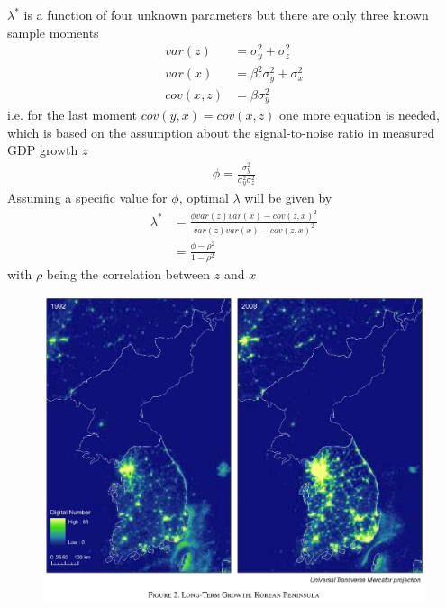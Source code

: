 \documentclass{beamer}
\begin{document}
\begin{frame}
  $\lambda^*$ is a function of four unknown parameters but there are only three known sample moments
  \begin{align}
    var(z) &= \sigma^2_y + \sigma^2_z\\
    var(x) &= \beta^2 \sigma^2_y + \sigma^2_x\\
    cov(x,z) &= \beta \sigma^2_y
  \end{align}
  i.e. for the last moment $cov(y,x)=cov(x,z)$ one more equation is needed, which is based on the assumption about the signal-to-noise ratio in measured GDP growth $z$
  \begin{align}
    \phi= \frac{\sigma^2_y}{\sigma^2_y \sigma^2_z}
  \end{align}
  \medskip
  Assuming a specific value for $\phi$, optimal $\lambda$ will be given by
  \begin{align}
    \lambda^* &= \frac{\phi var(z)var(x) -cov(z,x)^2}{var(z)var(x)-cov(z,x)^2} \\ \nonumber
     &= \frac{\phi-\rho^2}{1-\rho^2}
  \end{align}
  with $\rho$ being the correlation between $z$ and $x$
\end{frame}

\begin{frame}
  \begin{figure}
    \includegraphics[scale=.7]{henderson_et_al.eps}
  \end{figure}
\end{frame}
\end{document}
